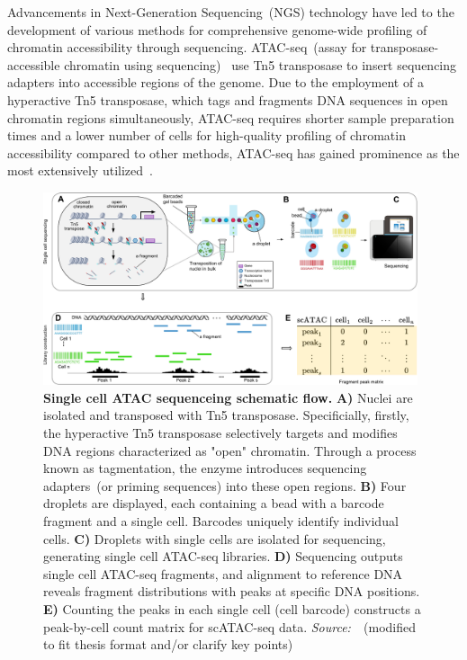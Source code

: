 Advancements in Next-Generation Sequencing~(NGS) technology have led to the development of various methods for comprehensive genome-wide profiling of chromatin accessibility through sequencing. ATAC-seq~(assay for transposase-accessible chromatin using sequencing)~\citep{buenrostro2013atacseq} use Tn5 transposase to insert sequencing adapters into accessible regions of the genome. Due to the employment of a hyperactive Tn5 transposase, which tags and fragments DNA sequences in open chromatin regions simultaneously, ATAC-seq requires shorter sample preparation times and a lower number of cells for high-quality profiling of chromatin accessibility compared to other methods, ATAC-seq has gained prominence as the most extensively utilized~\citep{minnoye2021chromatin}.

\begin{figure}[!ht]
	\centering
	\includegraphics[width=0.98\textwidth]{scATAC-seq/fig}
	\vspace{0.1cm}
	\caption[Single cell ATAC sequenceing schematic flow.]{ \textbf{Single cell ATAC sequenceing schematic flow.} \textbf{A)} Nuclei are isolated and transposed with Tn5 transposase. Specificially, firstly, the hyperactive Tn5 transposase selectively targets and modifies DNA regions characterized as "open" chromatin. Through a process known as tagmentation, the enzyme introduces sequencing adapters~(or priming sequences) into these open regions. \textbf{B)} Four droplets are displayed, each containing a bead with a barcode fragment and a single cell. Barcodes uniquely identify individual cells. \textbf{C)} Droplets with single cells are isolated for sequencing, generating single cell ATAC-seq libraries. \textbf{D)} Sequencing outputs single cell ATAC-seq fragments, and alignment to reference DNA reveals fragment distributions with peaks at specific DNA positions. \textbf{E)} Counting the peaks in each single cell (cell barcode) constructs a peak-by-cell count matrix for scATAC-seq data. \emph{Source:~\cite{yan2020reads}}~(modified to fit thesis format and/or clarify key points)}
	\label{fig:scATAC-seq}
\end{figure}

